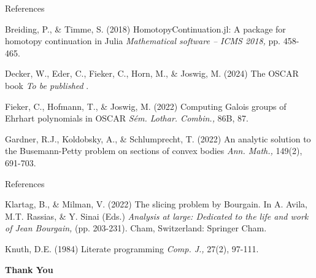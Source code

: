\documentclass[aspectratio=169,xcolor=dvipsnames]{beamer}
\begin{document}
\begin{frame}{References}
    \footnotesize{
        \begin{thebibliography}{99}
             Breiding, P., \& Timme, S. (2018)
            \newblock HomotopyContinuation.jl: A package for homotopy continuation in Julia
            \newblock \emph{Mathematical software – ICMS 2018,} pp. 458-465.
        \end{thebibliography}
        \begin{thebibliography}{99}
             Decker, W., Eder, C., Fieker, C., Horn, M., \& Joswig, M. (2024)
            \newblock The OSCAR book
            \newblock \emph{To be published} .
        \end{thebibliography}
        \begin{thebibliography}{99}
             Fieker, C., Hofmann, T., \& Joswig, M. (2022)
            \newblock Computing Galois groups of Ehrhart polynomials in OSCAR
            \newblock \emph{Sém. Lothar. Combin.,} 86B, 87.
        \end{thebibliography}
        \begin{thebibliography}{99}
              Gardner, R.J., Koldobsky, A., \& Schlumprecht, T. (2022)
            \newblock An analytic solution to the Busemann-Petty problem on sections of convex bodies
            \newblock \emph{Ann. Math.,} 149(2), 691-703.
        \end{thebibliography}
    }
\end{frame}

\begin{frame}{References}
    \footnotesize{
        \begin{thebibliography}{99}
              Klartag, B., \& Milman, V. (2022)
            \newblock The slicing problem by Bourgain.  In A. Avila, M.T. Rassias, \& Y. Sinai (Eds.)
            \newblock \emph{Analysis at large: Dedicated to the life and work of Jean Bourgain,} (pp. 203-231). Cham, Switzerland: Springer Cham.
        \end{thebibliography}
        \begin{thebibliography}{99}
             Knuth, D.E. (1984)
            \newblock  Literate programming
            \newblock \emph{Comp. J.,} 27(2), 97-111.
        \end{thebibliography}
}
\end{frame}


\begin{frame}
    \Huge{\centerline{\textbf{Thank You}}}
\end{frame}

\end{document}
